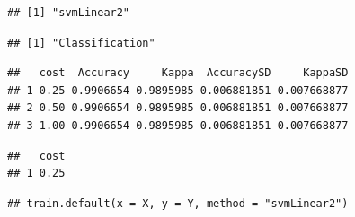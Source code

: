 \documentclass[12pt,spanish,a4paper]{article}
\newenvironment{Shaded}{\begin{snugshade}}{\end{snugshade}}
\newcommand{\NormalTok}[1]{#1}
\newcommand{\OperatorTok}[1]{\textcolor[rgb]{0.81,0.36,0.00}{\textbf{#1}}}
\numberwithin{equation}{section}
\begin{document}
\begin{verbatim}
## [1] "svmLinear2"
\end{verbatim}

\begin{Shaded}
\end{Shaded}

\begin{verbatim}
## [1] "Classification"
\end{verbatim}

\begin{Shaded}
\end{Shaded}

\begin{verbatim}
##   cost  Accuracy     Kappa  AccuracySD     KappaSD
## 1 0.25 0.9906654 0.9895985 0.006881851 0.007668877
## 2 0.50 0.9906654 0.9895985 0.006881851 0.007668877
## 3 1.00 0.9906654 0.9895985 0.006881851 0.007668877
\end{verbatim}

\begin{Shaded}
\end{Shaded}

\begin{verbatim}
##   cost
## 1 0.25
\end{verbatim}

\begin{Shaded}
\end{Shaded}

\begin{verbatim}
## train.default(x = X, y = Y, method = "svmLinear2")
\end{verbatim}

\begin{Shaded}
\end{Shaded}
\end{document}
